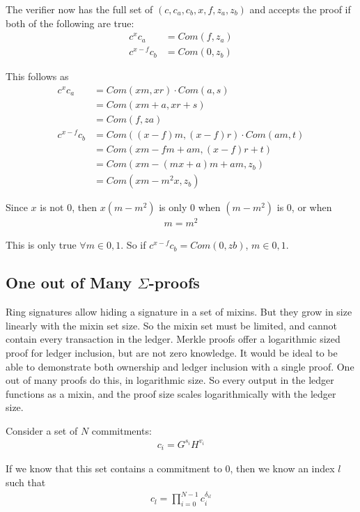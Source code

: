 \documentclass{article}
\begin{document}
The verifier now has the full set of $(c, c_a, c_b, x, f, z_a, z_b)$ and accepts the proof if both of the following are true:
\begin{align}
  c^x c_a &= Com(f, z_a)\\
  c^{x-f} c_b &= Com(0, z_b)
\end{align}

This follows as 
\begin{align}
  c^x c_a &= Com(xm,xr) \cdot Com(a,s)\\
          &= Com(xm+a, xr+s)\\
          &= Com(f, za)\\
  c^{x-f} c_b &= Com((x-f)m, (x-f)r) \cdot Com(am, t)\\
              &= Com(xm - fm + am, (x-f)r + t)\\
              &= Com(xm - (mx + a)m + am, z_b)\\
              &= Com(xm - m^2 x, z_b)
\end{align}

Since $x$ is not $0$, then $x (m-m^2)$ is only $0$ when $(m-m^2)$ is $0$, or when
\begin{align}
  m = m^2
\end{align}

This is only true $\forall m \in {0,1}$.  So if $c^{x-f} c_b = Com(0,zb)$, $m \in {0,1}$.


\subsection{One out of Many $\Sigma$-proofs}

Ring signatures allow hiding a signature in a set of mixins.  But they grow in size linearly with the mixin set size.  So the mixin set must be limited, and cannot contain every transaction in the ledger.  Merkle proofs offer a logarithmic sized proof for ledger inclusion, but are not zero knowledge.  It would be ideal to be able to demonstrate both ownership and ledger inclusion with a single proof.  One out of many proofs do this, in logarithmic size.  So every output in the ledger functions as a mixin, and the proof size scales logarithmically with the ledger size.

Consider a set of $N$ commitments:
\begin{align}
  c_i = G^{s_i} H^{v_i}
\end{align}

If we know that this set contains a commitment to $0$, then we know an index $l$ such that
\begin{align}
  c_l = \prod_{i=0}^{N-1} c_i^{\delta_{il}}
\end{align}
\end{document}
